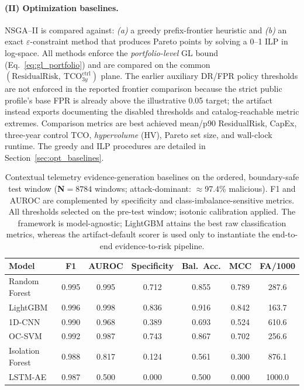\documentclass[preprint,12pt]{elsarticle}
\def\textsubscript#1{#1}%
\begin{document}
\paragraph{(II) Optimization baselines.}
NSGA--II is compared against: \emph{(a)} a greedy prefix-frontier heuristic and \emph{(b)} an exact $\varepsilon$-constraint method that produces Pareto points by solving a 0--1 ILP in log-space. All methods enforce the \emph{portfolio-level} GL bound (Eq.~\ref{eq:gl_portfolio}) and are compared on the common $(\text{ResidualRisk},\ \mathrm{TCO}^{\mathrm{ctrl}}_{3y})$ plane. The earlier auxiliary DR/FPR policy thresholds are not enforced in the reported frontier comparison because the strict public profile's base FPR is already above the illustrative 0.05 target; the artifact instead exports  documenting the disabled thresholds and catalog-reachable metric extremes. Comparison metrics are best achieved mean/p90 ResidualRisk, CapEx, three-year control TCO, \emph{hypervolume} (HV), Pareto set size, and wall-clock runtime. The greedy and ILP procedures are detailed in Section~\ref{sec:opt_baselines}.

\begin{table}[H]
\caption{Contextual telemetry evidence-generation baselines on the ordered, boundary-safe test window (\textbf{N}$=8784$ windows; attack-dominant: $\approx$97.4\% malicious). F\textsubscript{1} and AUROC are complemented by specificity and class-imbalance-sensitive metrics. All thresholds selected on the pre-test window; isotonic calibration applied. The framework is model-agnostic; LightGBM attains the best raw classification metrics, whereas the artifact-default scorer is used only to instantiate the end-to-end evidence-to-risk pipeline.}
\label{tab:ids_results}
\centering
\small
\begin{tabular}{@{}lcccccc@{}}
\toprule
Model & F\textsubscript{1} & AUROC & Specificity & Bal.\ Acc. & MCC & FA/1000 \\
\midrule
Random Forest & 0.995 & 0.995 & 0.712 & 0.855 & 0.789 & 287.6 \\
LightGBM & 0.996 & 0.998 & 0.836 & 0.916 & 0.842 & 163.7 \\
1D-CNN & 0.990 & 0.968 & 0.389 & 0.693 & 0.524 & 610.6 \\
OC-SVM & 0.992 & 0.987 & 0.743 & 0.867 & 0.702 & 256.6 \\
Isolation Forest & 0.988 & 0.817 & 0.124 & 0.561 & 0.300 & 876.1 \\
LSTM-AE & 0.987 & 0.500 & 0.000 & 0.500 & 0.000 & 1000.0 \\
\bottomrule
\end{tabular}
\end{table}
\end{document}
